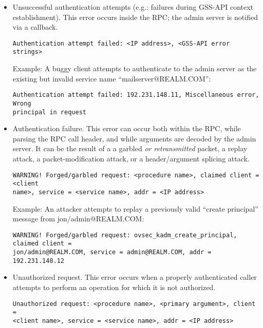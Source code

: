 \begin{itemize}
\item Unsuccessful authentication attempts (e.g.: failures during
GSS-API context establishment).  This error occurs inside the RPC; the
admin server is notified via a callback.

\begin{verbatim}
Authentication attempt failed: <IP address>, <GSS-API error strings>
\end{verbatim}

Example:  A buggy client attempts to authenticate to the admin server
as the existing but invalid service name ``mailserver@REALM.COM'':

\begin{verbatim}
Authentication attempt failed: 192.231.148.11, Miscellaneous error, Wrong
principal in request
\end{verbatim}

\item Authentication failure.  This error can occur both within the
RPC, while parsing the RPC call header, and while arguments are
decoded by the admin server.  It can be the result of a a garbled
{\it or retransmitted} packet, a replay attack, a packet-modification
attack, or a header/argument splicing attack.

\begin{verbatim}
WARNING! Forged/garbled request: <procedure name>, claimed client = <client
name>, service = <service name>, addr = <IP address>
\end{verbatim}

Example: An attacker attempts to replay a previously valid ``create
principal'' message from jon/admin@REALM.COM:

\begin{verbatim}
WARNING! Forged/garbled request: ovsec_kadm_create_principal, claimed client =
jon/admin@REALM.COM, service = admin@REALM.COM, addr = 192.231.148.12
\end{verbatim}

\item Unauthorized request.  This error occurs when a properly
authenticated caller attempts to perform an operation for which it is
not authorized.

\begin{verbatim}
Unauthorized request: <procedure name>, <primary argument>, client =
<client name>, service = <service name>, addr = <IP address>
\end{verbatim}


\end{itemize}

